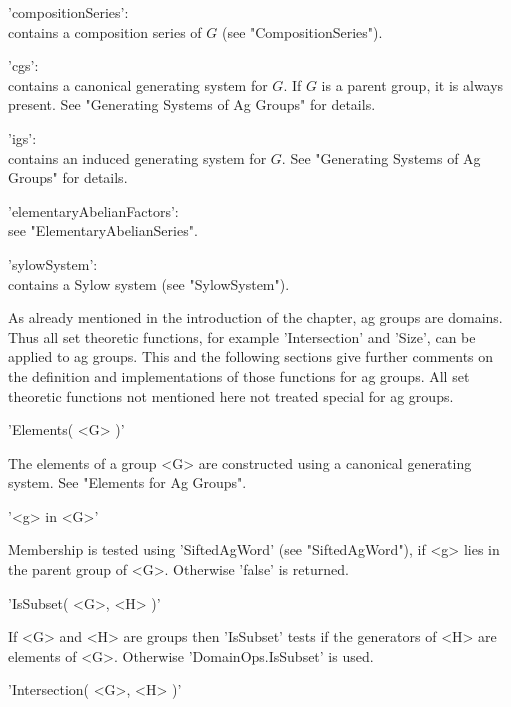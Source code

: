 'compositionSeries': \\
        contains a composition series of $G$ (see "CompositionSeries").

'cgs': \\
        contains   a canonical  generating   system  for   $G$.   If  $G$
        is a  parent  group, it  is  always   present.  See   "Generating
        Systems of Ag Groups" for details.

'igs': \\
        contains     an   induced  generating system     for   $G$.   See
        "Generating Systems of Ag Groups" for details.

'elementaryAbelianFactors': \\
        see "ElementaryAbelianSeries".

'sylowSystem': \\
        contains a Sylow system (see "SylowSystem").


%

As already  mentioned in the introduction  of  the chapter, ag groups are
domains.  Thus  all set theoretic  functions, for example  'Intersection'
and 'Size', can be applied to ag groups.  This and the following sections
give  further comments  on  the  definition and  implementations of those
functions for ag groups.  All set theoretic  functions not mentioned here
not treated special for ag groups.

\vspace{5mm}
'Elements( <G> )'%

The elements of a group <G> are constructed  using a canonical generating
system. See "Elements for Ag Groups".

\vspace{5mm}
'<g> in <G>'%

Membership is tested  using 'SiftedAgWord'  (see "SiftedAgWord"), if  <g>
lies in the parent group of <G>. Otherwise 'false' is returned.

\vspace{5mm}
'IsSubset( <G>, <H> )'%

If <G> and <H> are groups then 'IsSubset'  tests if the generators of <H>
are elements of <G>. Otherwise 'DomainOps.IsSubset' is used.

\vspace{5mm}
'Intersection( <G>, <H> )'%

